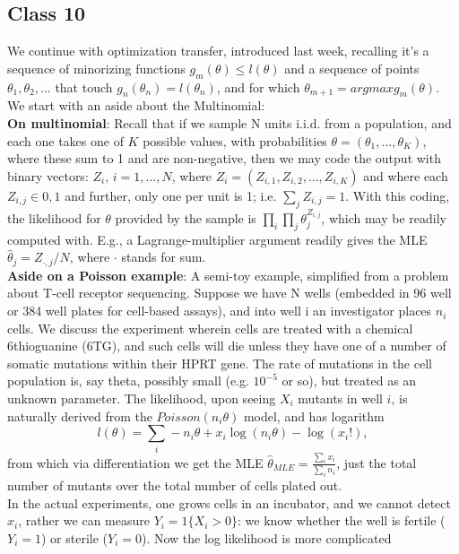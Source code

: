 \documentclass[11pt,a4paper]{article}
\begin{document}
\subsection*{Class 10}
We continue with optimization transfer, introduced last week, recalling it's a sequence of minorizing functions $g_m(\theta) \leq l(\theta)$ and a sequence of points $\theta_1, \theta_2,...$ that touch $g_n(\theta_n) = l(\theta_n)$, and for which $\theta_{m+1} = argmax g_m(\theta)$.\\
We start with an aside about the Multinomial:\\
\textbf{On multinomial}: Recall that if we sample N units i.i.d. from a population, and each one takes one of $K$ possible values, with probabilities $\theta=(\theta_1,...,\theta_K)$, where these sum to 1 and are non-negative, then we may code the output with binary vectors: $Z_i$, $i=1,...,N$, where $Z_i = (Z_{i,1}, Z_{i,2},...,Z_{i,K} )$ and where each $Z_{i,j} \in {0,1}$ and further, only one per unit is 1;  i.e. $\sum_j Z_{i,j} = 1$.  With this coding, the likelihood for $\theta$ provided by the sample is $\prod_i \prod_j \theta_j^{Z_{i,j}}$, which may be readily computed with. E.g., a Lagrange-multiplier argument readily gives the MLE  $\hat{\theta}_j = Z_{\cdot,j}/N$, where $\cdot$ stands for sum.\\
\textbf{Aside on a Poisson example}: A semi-toy example, simplified from a problem about T-cell receptor sequencing.  Suppose we have N wells (embedded in 96 well or 384 well plates for cell-based assays), and into well i an investigator places $n_i$ cells.  We discuss the experiment wherein cells are treated with a chemical 6thioguanine (6TG), and such cells will die unless they have one of a number of somatic mutations within their HPRT gene.   The rate of mutations in the cell population is, say theta, possibly small (e.g. $10^{-5}$ or so), but treated as an unknown parameter. The likelihood, upon seeing $X_i$ mutants in well $i$, is naturally derived from the $Poisson( n_i \theta )$ model, and has logarithm 
$$l(\theta) = \sum_i -n_i \theta   + x_i \log( n_i \theta )  - \log(x_i!) ,$$  from which via differentiation we get the MLE $\hat{\theta}_{MLE} = \frac{\sum_i x_i}{\sum_i n_i}$, just the total number of mutants over the total number of cells plated out.\\
In the actual experiments, one grows cells in an incubator, and we cannot detect $x_i$, rather we can measure $Y_i = 1\{X_i > 0 \}$: we know whether the well is fertile ($Y_i=1$) or sterile ($Y_i=0$). Now the log likelihood is more complicated
\end{document}
